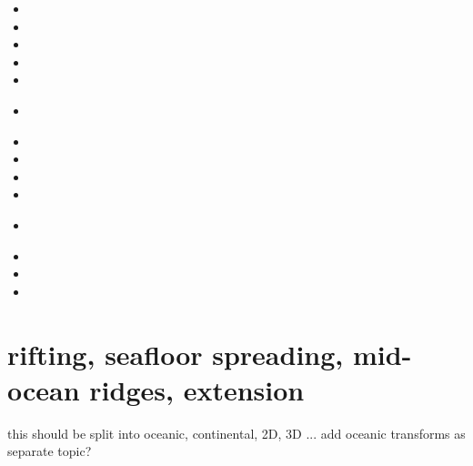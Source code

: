 \begin{small}
\begin{itemize}
\item[\nineteeneightysix] 
\item[\nineteeneightyeight] 
\item[\nineteenninetyone]
\item[\nineteenninetythree] 
\item[\nineteenninetyeight] 
\item[\nineteenninetynine] 
 \\
\item[\twothousand] 
\item[\twothousandthirteen] 
\item[\twothousandfourteen] 
\item[\twothousandnineteen] 
\item[\twothousandtwenty] 
 \\
\item[\twothousandtwentytwo] 
\item[\twothousandtwentythree] 
\item[\twothousandtwentyfour] 
\end{itemize}
\end{small}










\section{rifting, seafloor spreading, mid-ocean ridges, extension}

{\color{red} this should be split into oceanic, continental, 2D, 3D ...}
add oceanic transforms as separate topic?

